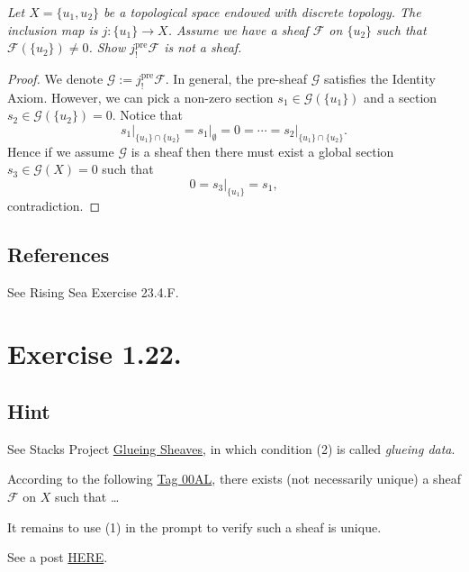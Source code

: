 \textit{Let $X=\{u_1,u_2\}$ be a topological space endowed with discrete topology. The inclusion map is $j:\{u_1\}\to X$. Assume we have a sheaf $\mathscr F$ on $\{u_2\}$ such that $\mathscr F(\{u_2\})\neq 0$. Show $j_{!}^{\text{pre}}\mathscr F$ is not a sheaf.}

\begin{proof}
    We denote $\mathscr G:=j_{!}^{\text{pre}}\mathscr F$.
    In general, the pre-sheaf $\mathscr G$ satisfies the Identity Axiom. However, we can pick a non-zero section $s_1\in\mathscr G(\{u_1\})$ and a section $s_2\in\mathscr G(\{u_2\})=0$. 
    Notice that 
    \[s_1\vert_{\{u_1\}\cap\{u_2\}}=s_1\vert_{\emptyset}=0=\cdots=s_2\vert_{\{u_1\}\cap\{u_2\}}.\] Hence if we assume $\mathscr G$ is a sheaf then there must exist a global section $s_3\in \mathscr G(X)=0$ such that 
    \[0=s_3\vert_{\{u_1\}}=s_1,\] contradiction.
\end{proof}

\subsection{References}

See Rising Sea \cite{RaviRisingSea} Exercise 23.4.F.

\section{Exercise 1.22.}

\subsection{Hint}
See Stacks Project \href{https://stacks.math.columbia.edu/tag/00AK}{Glueing Sheaves}, in which condition (2) is called \textit{glueing data}. 

According to the following \href{https://stacks.math.columbia.edu/tag/00AL}{Tag 00AL}, there exists (not necessarily unique) a sheaf $\mathscr F$ on $X$ such that \dots

It remains to use (1) in the prompt to verify such a sheaf is unique.

See a post \href{https://math.stackexchange.com/questions/455706/gluing-sheaves-can-we-realize-mathcalfw-as-some-kind-of-limit}{HERE}.